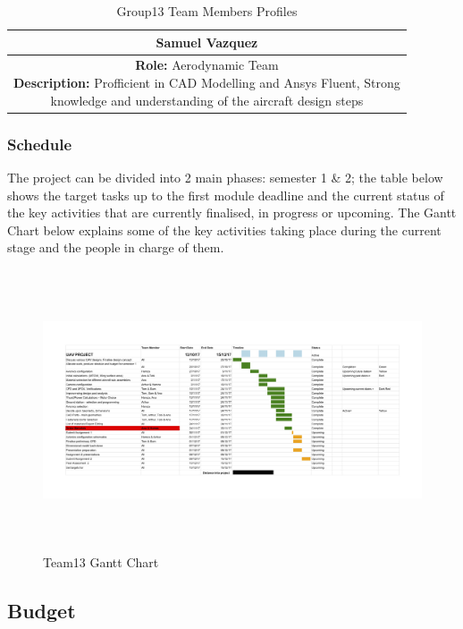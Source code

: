\documentclass[12pt]{article}
\begin{document}
\begin{table}[!htpb]
\begin{tabular}{ |c| }
        \hline
        \textbf{Samuel Vazquez} \\
        \hline
        \makecell[tl]{\textbf{Role:} Aerodynamic Team \\ \textbf{Description:} Profficient in CAD Modelling and Ansys Fluent, Strong \\ knowledge and understanding of the aircraft design steps} \\
        \hline
        \end{tabular}
    \caption{Group13 Team Members Profiles}
\end{table}

\newpage

\subsubsection{Schedule}

The project can be divided into 2 main phases: semester 1 \& 2; the table below shows the target tasks up to the first module deadline and the current status of the key activities that are currently finalised, in progress or upcoming. The Gantt Chart below explains some of the key activities taking place during the current stage and the people in charge of them. \\

\begin{figure}[hptb]
    \centering
    \includegraphics[height=83mm, angle=90, scale=1]{Gannt_Chart_Rotated.jpg}
    \caption{Team13 Gantt Chart}
\end{figure}

\newpage

\subsection{Budget}
\end{document}
